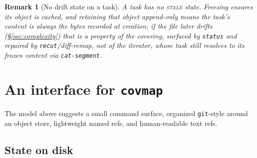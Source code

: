 \documentclass[11pt,a4paper]{article}
\newtheorem{remark}[definition]{Remark}
\begin{document}
\begin{remark}[No drift state on a task]\label{rem:iterator-drift}
A task has no \textsc{stale} state. Freezing ensures its object is cached, and
retaining that object append-only means the task's content is always the bytes
recorded at creation; if the file later drifts (\S\ref{sec:complexity}) that
is a property of the covering, surfaced by \texttt{status} and repaired by
\texttt{recut}/diff-remap, not of the iterator, whose task still resolves to
its frozen content via \texttt{cat-segment}.
\end{remark}

\section{An interface for \texttt{covmap}}\label{sec:interface}

The model above suggests a small command surface, organized
\texttt{git}-style around an object store, lightweight named refs,
and human-readable text refs.

\subsection{State on disk}
\end{document}

